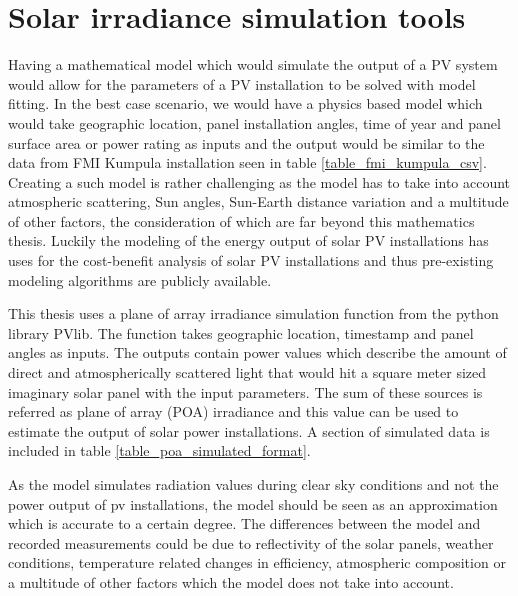 \chapter{Solar irradiance simulation tools}
Having a mathematical model which would simulate the output of a PV system would allow for the parameters of a PV installation to be solved with model fitting. In the best case scenario, we would have a physics based model which would take geographic location, panel installation angles, time of year and panel surface area or power rating as inputs and the output would be similar to the data from FMI Kumpula installation seen in table \ref{table_fmi_kumpula_csv}. Creating a such model is rather challenging as the model has to take into account atmospheric scattering, Sun angles, Sun-Earth distance variation and a multitude of other factors, the consideration of which are far beyond this mathematics thesis. Luckily the modeling of the energy output of solar PV installations has uses for the cost-benefit analysis of solar PV installations and thus pre-existing modeling algorithms are publicly available. 



This thesis uses a plane of array irradiance simulation function from the python library PVlib. The function takes geographic location, timestamp and panel angles as inputs. The outputs contain power values which describe the amount of direct and atmospherically scattered light that would hit a square meter sized imaginary solar panel with the input parameters. The sum of these sources is referred as plane of array (POA) irradiance and this value can be used to estimate the output of solar power installations. A section of simulated data is included in table \ref{table_poa_simulated_format}.

As the model simulates radiation values during clear sky conditions and not the power output of pv installations, the model should be seen as an approximation which is accurate to a certain degree. The differences between the model and recorded measurements could be due to reflectivity of the solar panels, weather conditions, temperature related changes in efficiency, atmospheric composition or a multitude of other factors which the model does not take into account.

